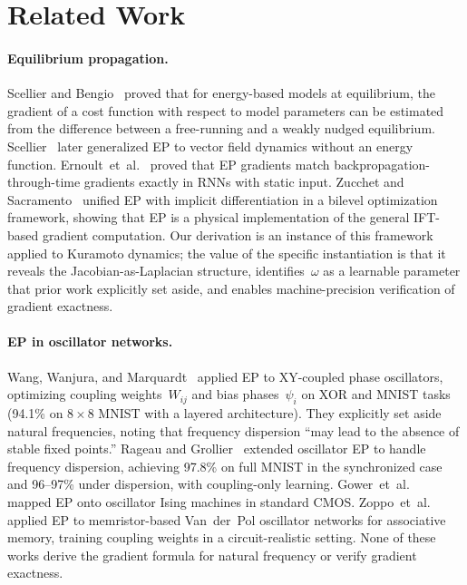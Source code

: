 \documentclass[11pt,a4paper]{article}
\begin{document}
\section{Related Work}
\label{sec:related}

\paragraph{Equilibrium propagation.}
Scellier and Bengio~\citeyearpar{scellier2017equilibrium} proved that for
energy-based models at equilibrium, the gradient of a cost function with
respect to model parameters can be estimated from the difference between a
free-running and a weakly nudged equilibrium. Scellier~\citeyearpar{scellier2018generalization}
later generalized EP to vector field dynamics without an energy function.
Ernoult~et~al.~\citeyearpar{ernoult2019updates} proved that EP gradients
match backpropagation-through-time gradients exactly in RNNs with static
input. Zucchet and Sacramento~\citeyearpar{zucchet2022beyond} unified EP with
implicit differentiation in a bilevel optimization framework, showing that
EP is a physical implementation of the general IFT-based gradient
computation. Our derivation is an instance of this framework applied to
Kuramoto dynamics; the value of the specific instantiation is that it
reveals the Jacobian-as-Laplacian structure, identifies~$\omega$ as a
learnable parameter that prior work explicitly set aside, and enables
machine-precision
verification of gradient exactness.

\paragraph{EP in oscillator networks.}
Wang, Wanjura, and Marquardt~\citeyearpar{wang2024training} applied EP to
XY-coupled phase oscillators, optimizing coupling weights~$W_{ij}$ and
bias phases~$\psi_i$ on XOR and MNIST tasks (94.1\% on $8 \times 8$
MNIST with a layered architecture). They explicitly set aside natural
frequencies, noting that frequency dispersion ``may lead to the absence
of stable fixed points.''
Rageau and Grollier~\citeyearpar{rageau2025training} extended oscillator EP to
handle frequency dispersion, achieving 97.8\% on full MNIST in the
synchronized case and 96--97\% under dispersion, with coupling-only
learning. Gower~et~al.~\citeyearpar{gower2025train,
gower2025learning} mapped EP onto oscillator Ising machines in standard
CMOS. Zoppo~et~al.~\citeyearpar{zoppo2022ep} applied EP to
memristor-based Van~der~Pol oscillator networks for associative memory,
training coupling weights in a circuit-realistic setting. None of these
works derive the gradient formula for natural frequency or verify
gradient exactness.
\end{document}
